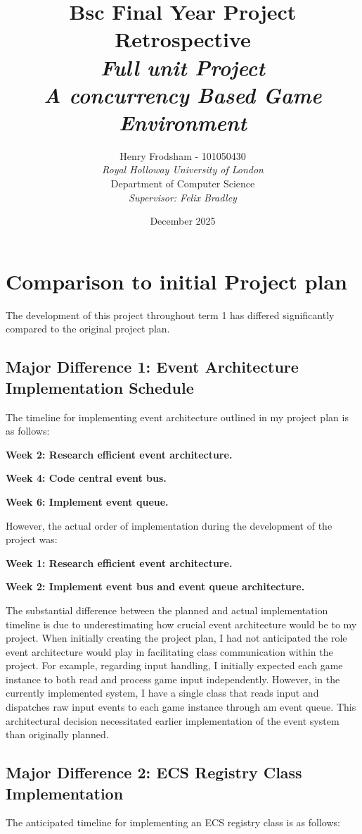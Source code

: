 \documentclass{article}
\title{Bsc Final Year Project Retrospective \\
		\textit{Full unit Project} \\
		\textit{A concurrency Based Game Environment}}
\author{Henry Frodsham - 101050430\\
		\textit{Royal Holloway University of London} \\
		Department of Computer Science \\
		\textit{Supervisor: Felix Bradley}}
\date{December 2025}
\begin{document}
\maketitle
\newpage
\tableofcontents
\newpage
\section{Comparison to initial Project plan}
The development of this project throughout term 1 has differed significantly compared to the original project plan.

\subsection{Major Difference 1: Event Architecture Implementation Schedule}
The timeline for implementing event architecture outlined in my project plan is as follows:

\textbf{Week 2: Research efficient event architecture.}

\textbf{Week 4: Code central event bus.}

\textbf{Week 6: Implement event queue.}

However, the actual order of implementation during the development of the project was:

\textbf{Week 1: Research efficient event architecture.}

\textbf{Week 2: Implement event bus and event queue architecture.}

The substantial difference between the planned and actual implementation timeline is due to underestimating how crucial event architecture would be to my project. When initially creating the project plan, I had not anticipated the role event architecture would play in facilitating class communication within the project. For example, regarding input handling, I initially expected each game instance to both read and process game input independently. However, in the currently implemented system, I have a single class that reads input and dispatches raw input events to each game instance through am event queue. This architectural decision necessitated earlier implementation of the event system than originally planned.

\subsection{Major Difference 2: ECS Registry Class Implementation}
The anticipated timeline for implementing an ECS registry class is as follows:
\end{document}
